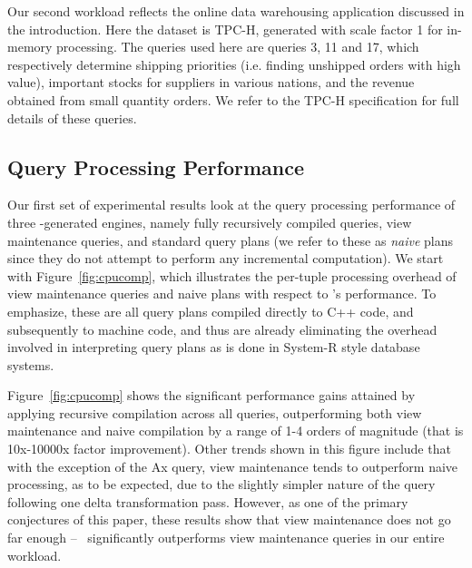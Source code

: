 Our second workload reflects the online data warehousing application discussed
in the introduction. Here the dataset is TPC-H, generated with scale factor 1
for in-memory processing. The queries used here are queries 3, 11 and 17, which
respectively determine shipping priorities (i.e. finding unshipped orders with
high value), important stocks for suppliers in various nations, and the revenue
obtained from small quantity orders. We refer to the TPC-H specification for
full details of these queries.

\subsection{Query Processing Performance}
Our first set of experimental results look at the query processing performance
of three \compiler-generated engines, namely fully recursively compiled queries,
view maintenance queries, and standard query plans (we refer to these as
\textit{naive} plans since they do not attempt to perform any incremental
computation). We start with Figure~\ref{fig:cpucomp}, which illustrates the
per-tuple processing overhead of view maintenance queries and naive plans with
respect to \compiler's performance. To emphasize, these are all query plans
compiled directly to C++ code, and subsequently to machine code, and thus are
already eliminating the overhead involved in interpreting query plans as is done
in System-R style database systems.

Figure~\ref{fig:cpucomp} shows the significant performance gains attained by
applying recursive compilation across all queries, outperforming both view
maintenance and naive compilation by a range of 1-4 orders of magnitude (that is
10x-10000x factor improvement). Other trends shown in this figure include that
with the exception of the Ax query, view maintenance tends to outperform naive
processing, as to be expected, due to the slightly simpler nature of the query
following one delta transformation pass. However, as one of the primary
conjectures of this paper, these results show that view maintenance does not go
far enough -- \compiler\ significantly outperforms view maintenance queries in
our entire workload.

